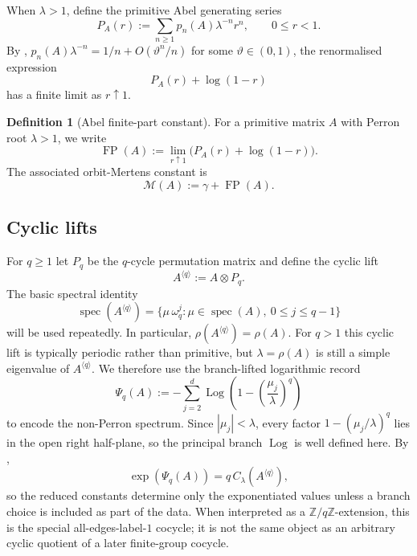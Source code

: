 \documentclass[11pt,a4paper]{amsart}
\theoremstyle{plain}
\theoremstyle{definition}
\newtheorem{definition}[theorem]{Definition}
\theoremstyle{remark}
\DeclareMathOperator{\spec}{spec}
\DeclareMathOperator{\FP}{FP}
\DeclareMathOperator{\Log}{Log}
\newcommand{\ZZ}{\mathbb{Z}}
\begin{document}
When \(\lambda>1\), define the primitive Abel generating series
\[
  P_A(r):=\sum_{n\ge 1}p_n(A)\lambda^{-n}r^n,
  \qquad 0\le r<1.
\]
By ,
\(p_n(A)\lambda^{-n}=1/n+O(\vartheta^n/n)\) for some
\(\vartheta\in(0,1)\), the renormalised expression
\[
  P_A(r)+\log(1-r)
\]
has a finite limit as \(r\uparrow 1\).

\begin{definition}[Abel finite-part constant]\label{def:abel-finite-part}
For a primitive matrix \(A\) with Perron root \(\lambda>1\), we write
\[
  \FP(A):=\lim_{r\uparrow 1}\bigl(P_A(r)+\log(1-r)\bigr).
\]
The associated orbit-Mertens constant is
\[
  \mathcal M(A):=\gamma+\FP(A).
\]
\end{definition}

\subsection{Cyclic lifts}

For \(q\ge 1\) let \(P_q\) be the \(q\)-cycle permutation matrix and
define the cyclic lift
\begin{equation}\label{eq:cyclic-lift-def}
  A^{\langle q\rangle}:=A\otimes P_q.
\end{equation}
The basic spectral identity
\[
  \spec(A^{\langle q\rangle})
  =\{\mu\,\omega_q^j:\mu\in\spec(A),\ 0\le j\le q-1\}
\]
will be used repeatedly. In particular,
\(\rho(A^{\langle q\rangle})=\rho(A)\). For \(q>1\) this cyclic lift is
typically periodic rather than primitive, but \(\lambda=\rho(A)\) is
still a simple eigenvalue of \(A^{\langle q\rangle}\). We therefore use
the branch-lifted logarithmic record
\[
  \Psi_q(A):=
  -\sum_{j=2}^d
    \Log\!\left(1-\left(\frac{\mu_j}{\lambda}\right)^q\right)
\]
to encode the non-Perron spectrum. Since \(|\mu_j|<\lambda\), every
factor \(1-(\mu_j/\lambda)^q\) lies in the open right half-plane, so the
principal branch \(\Log\) is well defined here. By
,
\[
  \exp(\Psi_q(A))=q\,C_\lambda(A^{\langle q\rangle}),
\]
so the reduced constants determine only the exponentiated values unless
a branch choice is included as part of the data.
When interpreted as a \(\ZZ/q\ZZ\)-extension, this is the special
all-edges-label-\(1\) cocycle; it is not the same object as an arbitrary
cyclic quotient of a later finite-group cocycle.
\end{document}
